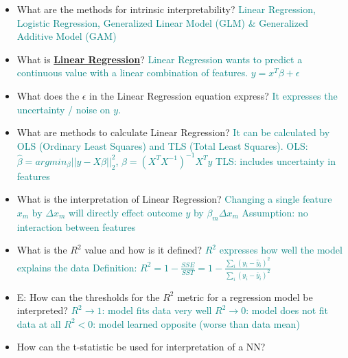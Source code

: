 \documentclass{report}
\newcommand{\asw}[2][teal]{}
\renewcommand{\asw}[2][teal]{\textcolor{#1}{#2}}
\begin{document}
	\begin{itemize}
	\item What are the methods for intrinsic interpretability?
	\asw{\newline Linear Regression, Logistic Regression, Generalized Linear Model (GLM) \& Generalized Additive Model (GAM)}
	
	\item What is \textbf{\underline{Linear Regression}}?
	\asw{\newline Linear Regression wants to predict a continuous value with a linear combination of features.
	\newline $y = x^T \beta + \epsilon$}
	\item What does the $\epsilon$ in the Linear Regression equation express?
	\asw{\newline It expresses the uncertainty / noise on $y$.}
	\item What are methods to calculate Linear Regression?
	\asw{\newline It can be calculated by OLS (Ordinary Least Squares) and TLS (Total Least Squares).
	\newline OLS: $\hat{\beta} = argmin_\beta ||y - X \beta||^2_2$, $\hat{\beta} = (X^T X^{-1})^{-1} X^T y$
	\newline TLS: includes uncertainty in features}
	\item What is the interpretation of Linear Regression?
	\asw{\newline Changing a single feature $x_m$ by $\Delta x_m$ will directly effect outcome $y$ by $\beta_m \Delta x_m$
		\newline Assumption: no interaction between features}
	\item What is the $R^2$ value and how is it defined?
	\asw{\newline $R^2$ expresses how well the model explains the data
		\newline Definition: $R^2 = 1 - \frac{SSE}{SST} = 1 - \frac{\sum_{i} (y_i - \hat{y}_i)^2}{\sum_i (y_i - \overline{y}_i)^2}$}
	\item E: How can the thresholds for the $R^2$ metric for a regression model be interpreted?
	\asw{\newline $R^2 \rightarrow 1$: model fits data very well
		\newline $R^2 \rightarrow 0$: model does not fit data at all
		\newline $R^2 < 0$: model learned opposite (worse than data mean)}
	\item How can the t-statistic be used for interpretation of a NN?

\end{itemize}
\end{document}
